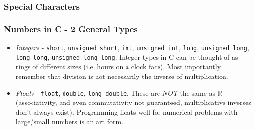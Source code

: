 \documentclass[table]{beamer}
\newif\ifschigh\schighfalse
\newcommand{\kw}[1]{\ifschigh\textcolor{red}{#1}\else\textcolor{keyword}{#1}\fi}
\begin{document}
\begin{frame}
\frametitle{Special Characters}
\end{frame}

\begin{frame}[fragile]
\frametitle{Numbers in C - 2 General Types}
\begin{itemize}
\item \emph{Integers} - \kw{{\tt short}, {\tt unsigned short}, {\tt int}, {\tt unsigned int}, {\tt long}, {\tt unsigned long}, {\tt long long}, {\tt unsigned long long}}. Integer types in C can be thought of as rings of different sizes (i.e. hours on a clock face). Most importantly remember that division is not necessarily the inverse of multiplication.
\item \emph{Floats} - \kw{{\tt float}, {\tt double}, {\tt long double}}.
These are \emph{NOT} the same as $\mathbb{R}$ (associativity, and even commutativity not guaranteed, multiplicative inverses don't always exist). Programming
floats well for numerical problems with large/small numbers is an art form.
\end{itemize}
\end{frame}
\end{document}
